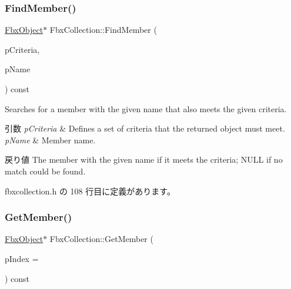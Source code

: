 \subsubsection{\texorpdfstring{Find\+Member()}{FindMember()}\hspace{0.1cm}{\footnotesize\ttfamily [2/2]}}
{\footnotesize\ttfamily \hyperlink{class_fbx_object}{Fbx\+Object}$\ast$ Fbx\+Collection\+::\+Find\+Member (\begin{DoxyParamCaption}\item[{const \hyperlink{class_fbx_criteria}{Fbx\+Criteria} \&}]{p\+Criteria,  }\item[{const char $\ast$}]{p\+Name }\end{DoxyParamCaption}) const\hspace{0.3cm}{\ttfamily [inline]}}

Searches for a member with the given name that also meets the given criteria. 
\begin{DoxyParams}{引数}
{\em p\+Criteria} & Defines a set of criteria that the returned object must meet. \\
\hline
{\em p\+Name} & Member name. \\
\hline
\end{DoxyParams}
\begin{DoxyReturn}{戻り値}
The member with the given name if it meets the criteria; N\+U\+LL if no match could be found. 
\end{DoxyReturn}


 fbxcollection.\+h の 108 行目に定義があります。

\mbox{\label{class_fbx_collection_a79c52e9fdd2c04a29b5ba04ff7e15bc6}} 
\subsubsection{\texorpdfstring{Get\+Member()}{GetMember()}\hspace{0.1cm}{\footnotesize\ttfamily [1/3]}}
{\footnotesize\ttfamily \hyperlink{class_fbx_object}{Fbx\+Object}$\ast$ Fbx\+Collection\+::\+Get\+Member (\begin{DoxyParamCaption}\item[{int}]{p\+Index = {} }\end{DoxyParamCaption}) const\hspace{0.3cm}{\ttfamily [inline]}}

